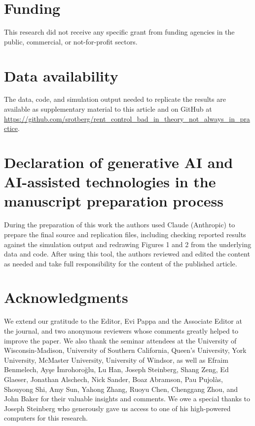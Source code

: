 \documentclass[parskip=full]{article}
\begin{document}
\section*{Funding}
This research did not receive any specific grant from funding agencies in the public, commercial, or not-for-profit sectors.

\section*{Data availability}
The data, code, and simulation output needed to replicate the results are available as supplementary material to this article and on GitHub at \url{https://github.com/srotberg/rent_control_bad_in_theory_not_always_in_practice}.

\section*{Declaration of generative AI and AI-assisted technologies in the manuscript preparation process}
During the preparation of this work the authors used Claude (Anthropic) to prepare the final source and replication files, including checking reported results against the simulation output and redrawing Figures 1 and 2 from the underlying data and code. After using this tool, the authors reviewed and edited the content as needed and take full responsibility for the content of the published article.

\section*{Acknowledgments}
We extend our gratitude to the Editor, Evi Pappa and the Associate Editor at the journal, and two anonymous reviewers whose comments greatly helped to improve the paper. We also thank the seminar attendees at the University of Wisconsin-Madison, University of Southern California, Queen's University, York University, McMaster University, University of Windsor, as well as Efraim Benmelech, Ay\c{s}e \.{I}mrohoro\u{g}lu, Lu Han, Joseph Steinberg, Shang Zeng, Ed Glaeser, Jonathan Alschech, Nick Sander, Boaz Abramson, Pau Pujol\`as, Shouyong Shi, Amy Sun, Yahong Zhang, Ruoyu Chen, Chenggang Zhou, and John Baker for their valuable insights and comments. We owe a special thanks to Joseph Steinberg who generously gave us access to one of his high-powered computers for this research.
\end{document}
